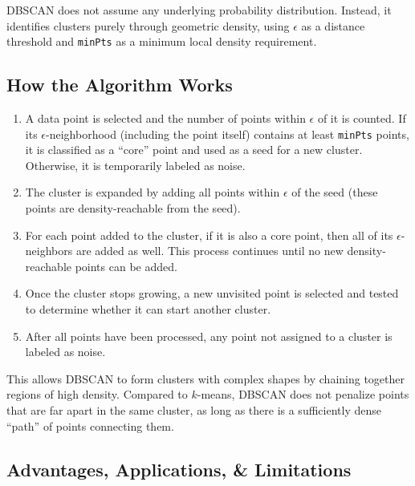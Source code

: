 DBSCAN does not assume any underlying probability distribution. Instead, it identifies clusters purely through geometric density, using $\epsilon$ as a distance threshold and \texttt{minPts} as a minimum local density requirement.


\bigskip

\subsection{How the Algorithm Works}

\medskip

\begin{enumerate}[itemsep=0.5em]
    \item A data point is selected and the number of points within $\epsilon$ of it is counted. If its $\epsilon$-neighborhood (including the point itself) contains at least \texttt{minPts} points, it is classified as a ``core'' point and used as a seed for a new cluster. Otherwise, it is temporarily labeled as noise.
    
    \item The cluster is expanded by adding all points within $\epsilon$ of the seed (these points are density-reachable from the seed).
    
    \item For each point added to the cluster, if it is also a core point, then all of its $\epsilon$-neighbors are added as well. This process continues until no new density-reachable points can be added.
    
    \item Once the cluster stops growing, a new unvisited point is selected and tested to determine whether it can start another cluster.
    
    \item After all points have been processed, any point not assigned to a cluster is labeled as noise.
\end{enumerate}

This allows DBSCAN to form clusters with complex shapes by chaining together regions of high density. Compared to $k$-means, DBSCAN does not penalize points that are far apart in the same cluster, as long as there is a sufficiently dense ``path'' of points connecting them.

\bigskip

\subsection{Advantages, Applications, \& Limitations}

